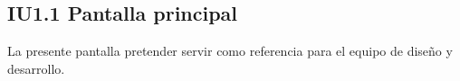 \newpage
\subsection{IU1.1 Pantalla principal}
La presente pantalla pretender servir como referencia para el equipo de diseño y desarrollo.
